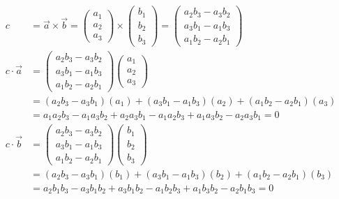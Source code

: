 \documentclass[a4paper]{article}
\begin{document}
  \subsection{}
    \begin{align*}
      c &= \vec{a} \times \vec{b}
      =
      \begin{pmatrix}
      a_1 \\ a_2 \\ a_3
      \end{pmatrix}
      \times
      \begin{pmatrix}
      b_1 \\ b_2 \\ b_3
      \end{pmatrix}
      =
      \begin{pmatrix}
      a_2 b_3 - a_3 b_2 \\ a_3 b_1 - a_1 b_3 \\ a_1 b_2 - a_2 b_1
      \end{pmatrix}
      \\[1em]
      c \cdot \vec{a}
      &=
      \begin{pmatrix}
      a_2 b_3 - a_3 b_2 \\ a_3 b_1 - a_1 b_3 \\ a_1 b_2 - a_2 b_1
      \end{pmatrix}
      \begin{pmatrix}
      a_1 \\ a_2 \\ a_3
      \end{pmatrix}
      \\[1em]
      &= (a_2 b_3 - a_3 b_1) (a_1) + (a_3 b_1 - a_1 b_3) (a_2) + (a_1 b_2 - a_2 b_1) (a_3)
      \\[1em]
      &= a_1 a_2 b_3 - a_1 a_3 b_2 + a_2 a_3 b_1 - a_1 a_2 b_3 + a_1 a_3 b_2 - a_2 a_3 b_1
      = 0
      \\[1em]
      c \cdot \vec{b}
      &=
      \begin{pmatrix}
      a_2 b_3 - a_3 b_2 \\ a_3 b_1 - a_1 b_3 \\ a_1 b_2 - a_2 b_1
      \end{pmatrix}
      \begin{pmatrix}
      b_1 \\ b_2 \\ b_3
      \end{pmatrix}
      \\[1em]
      &= (a_2 b_3 - a_3 b_1) (b_1) + (a_3 b_1 - a_1 b_3) (b_2) + (a_1 b_2 - a_2 b_1) (b_3)
      \\[1em]
      &= a_2 b_1 b_3 - a_3 b_1 b_2 + a_3 b_1 b_2 - a_1 b_2 b_3 + a_1 b_3 b_2 - a_2 b_1 b_3
      = 0
    \end{align*}
\end{document}
